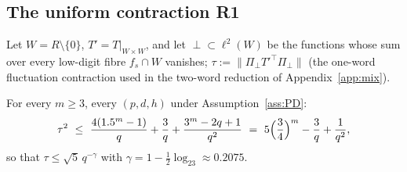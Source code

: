 \subsection{The uniform contraction R1}
Let $W=R\setminus\{0\}$, $T'=T|_{W\times W}$, and let $\perp\subset\ell^2(W)$ be the functions whose sum over every
low-digit fibre $f_s\cap W$ vanishes; $\tau:=\|\Pi_\perp T'^{\top}\Pi_\perp\|$ (the one-word fluctuation contraction used in
the two-word reduction of Appendix~\ref{app:mix}).

\begin{theorem}[R1]\label{thm:R1}
For every $m\ge3$, every $(p,d,h)$ under Assumption~\ref{ass:PD}:
\[
\tau^2\ \le\ \frac{4(1.5^m-1)}{q}+\frac{3}{q}+\frac{3^m-2q+1}{q^2}\ =\ 5\Bigl(\frac34\Bigr)^m-\frac3q+\frac1{q^2},
\]
so that $\tau\le\sqrt5\,q^{-\gamma}$ with $\gamma=1-\tfrac12\log_23\approx0.2075$.
\end{theorem}
